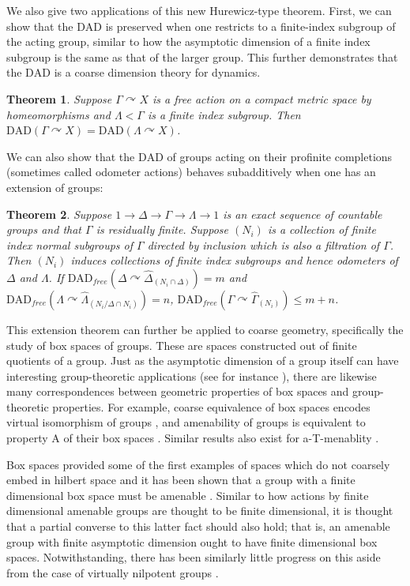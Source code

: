 \documentclass[12pt]{article}
\newcommand{\acts}{\curvearrowright}
\newcommand{\dad}{\text{DAD}}
\newtheorem{thmx}{Theorem} %
\begin{document}
We also give two applications of this new Hurewicz-type theorem.  First, we can show that the $\dad$ is preserved when one restricts to a finite-index subgroup of the acting group, similar to how the asymptotic dimension of a finite index subgroup is the same as that of the larger group.  This further demonstrates that the $\dad$ is a coarse dimension theory for dynamics.  

\begin{thmx} Suppose $\Gamma\acts X$ is a free action on a compact metric space by homeomorphisms and $\Lambda<\Gamma$ is a finite index subgroup.  Then $\dad(\Gamma\acts X)= \dad(\Lambda\acts X)$.  
\end{thmx}\label{Theorem B}

\noindent We can also show that the $\dad$ of groups acting on their profinite completions (sometimes called odometer actions) behaves subadditively when one has an extension of groups:

\begin{thmx}
Suppose $1\to \Delta\to \Gamma\to \Lambda\to 1$ is an exact sequence of countable groups and that $\Gamma$ is residually finite.  Suppose $(N_i)$ is a collection of finite index normal subgroups of $\Gamma$ directed by inclusion which is also a filtration of $\Gamma$.  Then $(N_i)$ induces collections of finite index subgroups and hence odometers of $\Delta$ and $\Lambda$.   If $\text{DAD}_{free}(\Delta\acts \widehat{\Delta}_{(N_i\cap \Delta)}) = m$ and $\text{DAD}_{free}(\Lambda\acts \widehat{\Lambda}_{(N_i/\Delta\cap N_i)}) = n$, $\text{DAD}_{free}(\Gamma\acts \widehat{\Gamma}_{(N_i)}) \leq m + n$.  
\end{thmx}\label{Theorem C}

This extension theorem can further be applied to coarse geometry, specifically the study of box spaces of groups.  These are spaces constructed out of finite quotients of a group.  Just as the asymptotic dimension of a group itself can have interesting group-theoretic applications (see for instance \cite{MR2431020}), there are likewise many correspondences between geometric properties of box spaces and group-theoretic properties.  For example, coarse equivalence of box spaces encodes virtual isomorphism of groups \cite{MR4091056}, and amenability of groups is equivalent to property A of their box spaces \cite[Propsotion 11.39]{Roe2003LecturesOC}.  Similar results also exist for a-T-menablity \cite{https://doi.org/10.1112/blms/bdt045}.  

Box spaces provided some of the first examples of spaces which do not coarsely embed in hilbert space \cite[Remark 11.27]{Roe2003LecturesOC} and it has been shown that a group with a finite dimensional box space must be amenable \cite[Remark 11.38 and Proposition 11.39]{Roe2003LecturesOC}.  Similar to how actions by finite dimensional amenable groups are thought to be finite dimensional, it is thought that a partial converse to this latter fact should also hold; that is, an amenable group with finite asymptotic dimension ought to have finite dimensional box spaces.  Notwithstanding, there has been similarly little progress on this aside from the case of virtually nilpotent groups \cite{boxspacesDT}.  
\end{document}
